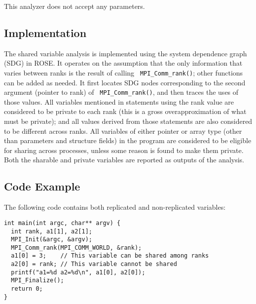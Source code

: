This analyzer does not accept any parameters.

\subsection{Implementation}

The shared variable analysis is implemented using the system dependence
graph (SDG) in ROSE.  It operates on the assumption that the only
information that varies between ranks is the result of calling {\tt
MPI_Comm_rank()}; other functions can be added as needed.  It first locates
SDG nodes corresponding to the second argument (pointer to rank) of {\tt
MPI_Comm_rank()}, and then traces the uses of those values.  All variables
mentioned in statements using the rank value are considered to be private
to each rank (this is a gross overapproximation of what must be private);
and all values derived from those statements are also considered to be
different across ranks.  All variables of either pointer or array type
(other than parameters and structure fields) in the program are considered
to be eligible for sharing across processes, unless some reason is found to
make them private.  Both the sharable and private variables are reported as
outputs of the analysis.

\subsection{Code Example}

The following code contains both replicated and non-replicated variables:

\begin{verbatim}
int main(int argc, char** argv) {
  int rank, a1[1], a2[1];
  MPI_Init(&argc, &argv);
  MPI_Comm_rank(MPI_COMM_WORLD, &rank);
  a1[0] = 3;    // This variable can be shared among ranks
  a2[0] = rank; // This variable cannot be shared
  printf("a1=%d a2=%d\n", a1[0], a2[0]);
  MPI_Finalize();
  return 0;
}
\end{verbatim}


